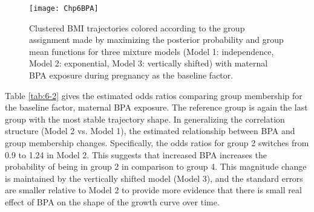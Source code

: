 \begin{figure}[h]
\centering
\texttt{[image: Chp6BPA]}
\label{fig:6-2}
\caption{Clustered BMI trajectories colored according to the group assignment made by maximizing the posterior probability and group mean functions for three mixture models (Model 1: independence, Model 2: exponential, Model 3: vertically shifted) with maternal BPA exposure during pregnancy as the baseline factor.}
\end{figure}

Table \ref{tab:6-2} gives the estimated odds ratios comparing group membership for the baseline factor, maternal BPA exposure. The reference group is again the last group with the most stable trajectory shape. In generalizing the correlation structure (Model 2 vs. Model 1), the estimated relationship between BPA and group membership changes. Specifically, the odds ratios for group 2 switches from 0.9 to 1.24 in Model 2. This suggests that increased BPA increases the probability of being in group 2 in comparison to group 4. This magnitude change is maintained by the vertically shifted model (Model 3), and the standard errors are smaller relative to Model 2 to provide more evidence that there is small real effect of BPA on the shape of the growth curve over time. 

